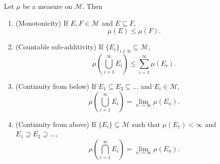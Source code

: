 \documentclass{functionspaces}
\begin{document}
\begin{theorem}
Let \( \mu \) be a measure on \( \mathcal{M} \). Then

\begin{enumerate}[label=(\arabic*)]
    \item (Monotonicity) If \( E, F \in \mathcal{M} \) and \( E \subseteq F \),
    \[
    \mu(E) \leq \mu(F).
    \]
    
    \item (Countable sub-additivity) If \( \{E_i\}_{i \in \mathbb{N}} \subseteq \mathcal{M} \),
    \[
    \mu\left( \bigcup_{i=1}^{\infty} E_i \right) \leq \sum_{i=1}^{\infty} \mu(E_i).
    \]
    
    \item (Continuity from below) If \( E_1 \subseteq E_2 \subseteq \ldots \) and \( E_i \in \mathcal{M} \),
    \[
    \mu\left( \bigcup_{i=1}^{\infty} E_i \right) = \lim_{n \to \infty} \mu(E_n).
    \]
    
    \item (Continuity from above) If \( \{E_i\} \subseteq \mathcal{M} \) such that \( \mu(E_1) < \infty \) and \( E_1 \supseteq E_2 \supseteq \ldots \),
    \[
    \mu\left( \bigcap_{i=1}^{\infty} E_i \right) = \lim_{n \to \infty} \mu(E_n).
    \]
\end{enumerate}
\end{theorem}
\end{document}
